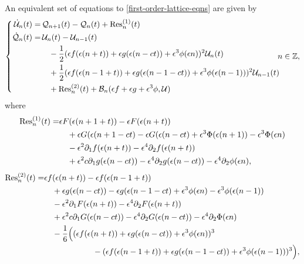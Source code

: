 An equivalent set of equations to \cref{first-order-lattice-eqns} are given by
\begin{equation}\label{error-lattice-eqns}
	\left\{\begin{aligned}
			\dot{\mathcal U}_n(t) =& \, \mathcal Q_{n+1}(t) - \mathcal Q_n(t) +\mathrm{Res}_n^{(1)}(t) \\
\dot{\mathcal Q}_n(t) =& \, \mathcal U_n(t) - \mathcal U_{n-1}(t)  \\
&\quad - \frac 1 2 (\epsilon f(\epsilon(n+t)) + \epsilon g(\epsilon(n-ct)) + \epsilon^3\phi(\epsilon n))^2 \mathcal U_{n}(t) \\
&\quad + \frac 12  (\epsilon f(\epsilon(n-1+t)) + \epsilon g(\epsilon(n-1-ct)) + \epsilon^3\phi(\epsilon (n-1)))^2 \mathcal U_{n-1}(t) \\
&\quad +\mathrm{Res}_n^{(2)}(t) + \mathcal B_n(\epsilon f + \epsilon g + \epsilon^3 \phi,  \mathcal U) 
	\end{aligned} \right. \hspace{-0.5em}n\in\mathbb{Z},
\end{equation}
where
\begin{equation*}
\begin{aligned}
	\mathrm{Res}_n^{(1)}(t) =& \epsilon F(\epsilon(n+1+t)) - \epsilon F(\epsilon(n+t)) \\
	&\quad + \epsilon G(\epsilon(n+1-c t) - \epsilon G(\epsilon(n-c t) + \epsilon^3 \Phi(\epsilon (n+1))   - \epsilon^3 \Phi(\epsilon n) \\
	&\quad - \epsilon^2 \partial_1 f(\epsilon(n+t)) - \epsilon^4 \partial_2
	f(\epsilon(n+t)) \\
	&\quad + \epsilon^2 c \partial_1 g(\epsilon(n-ct)) - \epsilon^4 \partial_2 g(\epsilon(n-ct)) - \epsilon^4 \partial_2 \phi(\epsilon n) ,
\end{aligned}
\end{equation*}
\begin{equation*}
\begin{aligned}
	\mathrm{Res}_n^{(2)}(t) =& \epsilon f(\epsilon(n+t)) - \epsilon f(\epsilon(n-1+t)) \\
	&\quad+ \epsilon g(\epsilon(n-c t)) - \epsilon g(\epsilon(n-1-c t) + \epsilon^3 \phi(\epsilon n) - \epsilon^3 \phi(\epsilon (n-1)) \\
	&\quad - \epsilon^2 \partial_1 F(\epsilon(n+t)) - \epsilon^4 \partial_2
	F(\epsilon(n+t)) \\
	&\quad + \epsilon^2 c \partial_1 G(\epsilon(n-ct)) - \epsilon^4 \partial_2 G(\epsilon(n-ct)) - \epsilon^4 \partial_2 \Phi(\epsilon n) \\
	&\quad - \frac 1 6 \Big( (\epsilon f(\epsilon(n+t)) + \epsilon g(\epsilon(n-c t)) + \epsilon^3 \phi(\epsilon n))^3 \\
	&\hspace{6em} - (\epsilon f(\epsilon(n-1+t)) + \epsilon g(\epsilon(n-1-c t)) + \epsilon^3 \phi(\epsilon (n-1)))^3 \Big),
\end{aligned}
\end{equation*}

